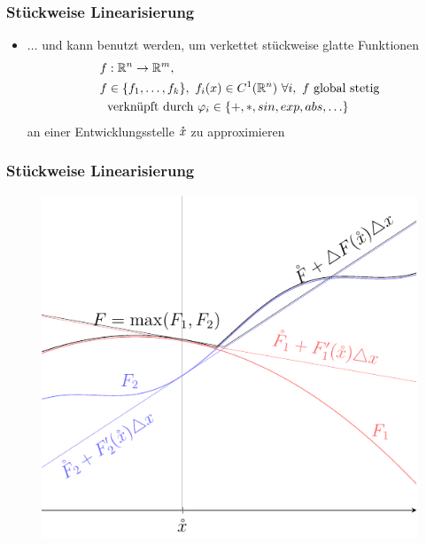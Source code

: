 \begin{frame}[<+->]
\frametitle{Stückweise Linearisierung}
\begin{itemize}
 \item $\ldots$ und kann benutzt werden, um verkettet stückweise glatte Funktionen 
 \[
 \begin{aligned}
   f&:\mathbb R^n \to \mathbb R^m, \\
 f&\in \lbrace f_1,\ldots,f_k\rbrace,~f_i(x) \in C^1(\mathbb R^n)~\forall i,~f \text{ global stetig}\\
 &\text{verknüpft durch }\varphi_i \in \lbrace +,*,sin,exp,abs ,\ldots\rbrace                                                                
 \end{aligned}
 \]
an einer Entwicklungsstelle $\mathring{x}$ zu approximieren
\end{itemize}
\end{frame}

\begin{frame}[<+->]
\frametitle{Stückweise Linearisierung}
\begin{figure}
\centering
\includegraphics[width=0.65\linewidth]{../dipl_tex/img/tikz/piecewise_linearization.pdf}
\end{figure}
\end{frame}

